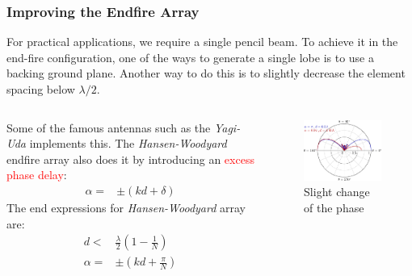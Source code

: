 \documentclass[10pt]{beamer}
\begin{document}
\begin{frame}
    \frametitle{Improving the Endfire Array}
For practical applications, we require a single pencil beam. To achieve it in the end-fire configuration, one of the ways to generate a single lobe is to use a backing ground plane. Another way to do this is to slightly decrease the element spacing below $\lambda/2$.

\begin{columns}[T] %
    \begin{column}{.7\textwidth}
Some of the famous antennas such as the \textit{Yagi-Uda} implements this. The \textit{Hansen-Woodyard} endfire array also does it by introducing an \textcolor{red}{excess phase delay}:
\small
\begin{align*}
    \alpha {}=& \pm \left(k d + \delta \right)
\end{align*}
The end expressions for \textit{Hansen-Woodyard} array are:
\begin{align*}
    d {}<& \frac{\lambda}{2} \left(1 - \frac{1}{N}\right) \\
    \alpha {}=& \pm \left( k d + \frac{\pi }{N}\right)
\end{align*}
    \end{column}
    \begin{column}{.4\textwidth}
        \begin{figure}[t!]
            \centering
            \includegraphics[width=.95\textwidth]{endfire_two.pdf}
            \caption{Slight change of the phase}
          \end{figure}
    \end{column}%
\end{columns}
\end{frame}
\end{document}
